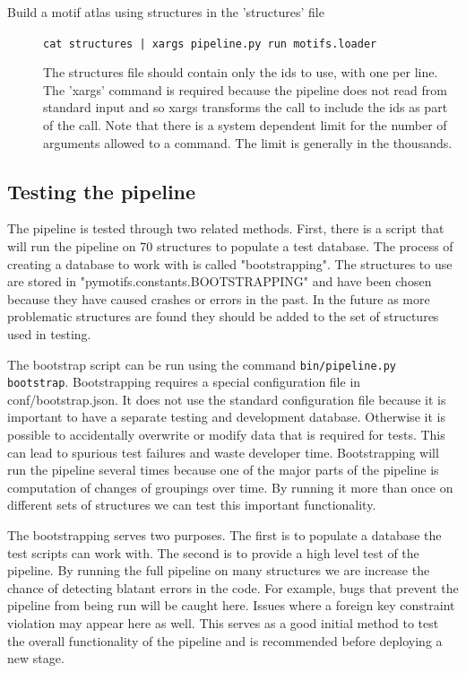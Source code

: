 \begin{description}
        \item [Build a motif atlas using structures in the 'structures' file]
                {\tt cat structures | xargs pipeline.py run motifs.loader}

                The structures file should contain only the ids to use, with one
                per line. The 'xargs' command is required because the pipeline
                does not read from standard input and so xargs transforms the
                call to include the ids as part of the call. Note that there is
                a system dependent limit for the number of arguments allowed to
                a command. The limit is generally in the thousands.
\end{description}

\subsection{Testing the pipeline}

The pipeline is tested through two related methods. First, there is a script
that will run the pipeline on 70 structures to populate a test database. The
process of creating a database to work with is called "bootstrapping". The
structures to use are stored in "pymotifs.constants.BOOTSTRAPPING" and have been
chosen because they have caused crashes or errors in the past. In the future as
more problematic structures are found they should be added to the set of
structures used in testing.

The bootstrap script can be run using the command {\tt bin/pipeline.py bootstrap}.
Bootstrapping requires a special configuration file in conf/bootstrap.json. It
does not use the standard configuration file because it is important to have a
separate testing and development database. Otherwise it is possible to
accidentally overwrite or modify data that is required for tests. This can lead
to spurious test failures and waste developer time. Bootstrapping will run the
pipeline several times because one of the major parts of the pipeline is
computation of changes of groupings over time. By running it more than once on
different sets of structures we can test this important functionality.

The bootstrapping serves two purposes. The first is to populate a database the
test scripts can work with. The second is to provide a high level test of the
pipeline. By running the full pipeline on many structures we are increase the
chance of detecting blatant errors in the code. For example, bugs that prevent
the pipeline from being run will be caught here. Issues where a foreign key
constraint violation may appear here as well. This serves as a good initial
method to test the overall functionality of the pipeline and is recommended
before deploying a new stage.

